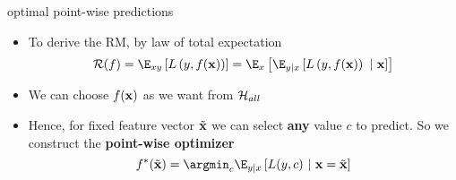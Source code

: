 \documentclass[11pt,compress,t,notes=noshow, xcolor=table]{beamer}
\begin{document}



% 
% 



\begin{frame}[t]{optimal point-wise predictions}  

\begin{itemize}

\item To derive the RM, by law of total expectation 
$$    \riskf = \E_{xy} \left[\Lxy\right] 
    = \E_x \left[\E_{y|x}\left[\Lxy~|~\xv\right]\right]$$

	\item We can choose $f(\mathbf{x})$ as we want from $\mathcal{H}_{all}$ %
	\item Hence, for fixed feature vector $\tilde{\mathbf{x}}$ we can select \textbf{any} value $c$ to predict. So we construct the \textbf{point-wise optimizer} 
 $$\fbayes(\xtil) = \argmin_c \E_{y|x}\left[L(y, c)~|~ \xv = \xtil \right] $$

\end{itemize}





\end{frame}
\end{document}
